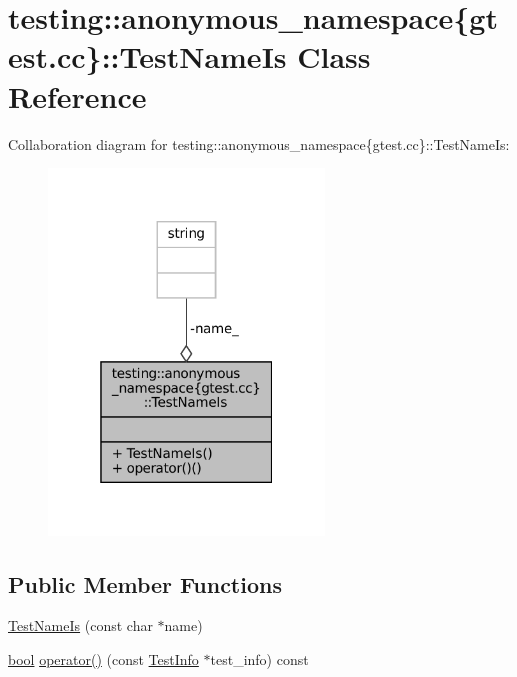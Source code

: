\hypertarget{classtesting_1_1anonymous__namespace_02gtest_8cc_03_1_1TestNameIs}{}\section{testing\+:\+:anonymous\+\_\+namespace\{gtest.\+cc\}\+:\+:Test\+Name\+Is Class Reference}
\label{classtesting_1_1anonymous__namespace_02gtest_8cc_03_1_1TestNameIs}


Collaboration diagram for testing\+:\+:anonymous\+\_\+namespace\{gtest.\+cc\}\+:\+:Test\+Name\+Is\+:
\nopagebreak
\begin{figure}[H]
\begin{center}
\leavevmode
\includegraphics[width=208pt]{classtesting_1_1anonymous__namespace_02gtest_8cc_03_1_1TestNameIs__coll__graph}
\end{center}
\end{figure}
\subsection*{Public Member Functions}
\begin{DoxyCompactItemize}
\item 
\hyperlink{classtesting_1_1anonymous__namespace_02gtest_8cc_03_1_1TestNameIs_a4101ae9f7e7d6b80cf9445848e23b36e}{Test\+Name\+Is} (const char $\ast$name)
\item 
\hyperlink{classbool}{bool} \hyperlink{classtesting_1_1anonymous__namespace_02gtest_8cc_03_1_1TestNameIs_abfef5b9978381623faeb68f4ed67532a}{operator()} (const \hyperlink{classtesting_1_1TestInfo}{Test\+Info} $\ast$test\+\_\+info) const
\end{DoxyCompactItemize}
